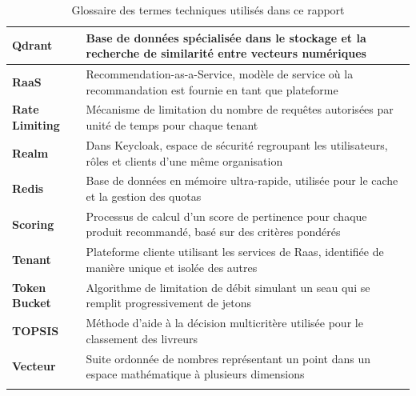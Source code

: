 \documentclass[11pt,a4paper]{report}
\begin{document}
\begin{longtable}{>{\columncolor{raasLight}\bfseries}p{3.5cm}p{11cm}}
\midrule
Qdrant & Base de données spécialisée dans le stockage et la recherche de similarité entre vecteurs numériques \\
\midrule
RaaS & Recommendation-as-a-Service, modèle de service où la recommandation est fournie en tant que plateforme \\
\midrule
Rate Limiting & Mécanisme de limitation du nombre de requêtes autorisées par unité de temps pour chaque tenant \\
\midrule
Realm & Dans Keycloak, espace de sécurité regroupant les utilisateurs, rôles et clients d'une même organisation \\
\midrule
Redis & Base de données en mémoire ultra-rapide, utilisée pour le cache et la gestion des quotas \\
\midrule
Scoring & Processus de calcul d'un score de pertinence pour chaque produit recommandé, basé sur des critères pondérés \\
\midrule
Tenant & Plateforme cliente utilisant les services de Raas, identifiée de manière unique et isolée des autres \\
\midrule
Token Bucket & Algorithme de limitation de débit simulant un seau qui se remplit progressivement de jetons \\
\midrule
TOPSIS & Méthode d'aide à la décision multicritère utilisée pour le classement des livreurs \\
\midrule
Vecteur & Suite ordonnée de nombres représentant un point dans un espace mathématique à plusieurs dimensions \\
\bottomrule
\caption{Glossaire des termes techniques utilisés dans ce rapport}
\label{tab:glossaire}
\end{longtable}
\end{document}
